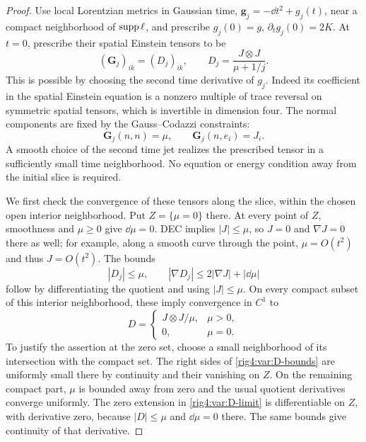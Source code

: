 \begin{proof}
Use local Lorentzian metrics in Gaussian time,
$\mathbf g_j=-\dd t^2+g_j(t)$, near a compact neighborhood of
$\operatorname{supp}\ell$, and prescribe
$g_j(0)=g$, $\partial_tg_j(0)=2K$. At $t=0$, prescribe their spatial
Einstein tensors to be
\begin{equation}
 (\mathbf G_j)_{ik}=(D_j)_{ik},\qquad
 D_j=\frac{J\otimes J}{\mu+1/j}.
\label{rig4:var:spatial-Einstein}
\end{equation}
This is possible by choosing the second time derivative of $g_j$.
Indeed its coefficient in the spatial Einstein equation is a nonzero
multiple of trace reversal on symmetric spatial tensors, which is
invertible in dimension four. The normal components are fixed by the
Gauss--Codazzi constraints:
\[
 \mathbf G_j(n,n)=\mu,\qquad \mathbf G_j(n,e_i)=J_i.
\]
A smooth choice of the second time jet realizes the prescribed tensor in
a sufficiently small time neighborhood. No equation or energy condition
away from the initial slice is required.

We first check the convergence of these tensors along the slice, within
the chosen open interior neighborhood. Put $Z=\{\mu=0\}$ there.
At every point of $Z$, smoothness and $\mu\ge0$ give
$\dd\mu=0$. DEC implies $|J|\le\mu$, so $J=0$ and $\nabla J=0$ there
as well; for example, along a smooth curve through the point,
$\mu=O(t^2)$ and thus $J=O(t^2)$. The bounds
\begin{equation}
 |D_j|\le\mu,
 \qquad |\nabla D_j|\le2|\nabla J|+|\dd\mu|
\label{rig4:var:D-bounds}
\end{equation}
follow by differentiating the quotient and using $|J|\le\mu$.
On every compact subset of this interior neighborhood, these imply
convergence in $C^1$ to
\begin{equation}
 D=\begin{cases}J\otimes J/\mu,&\mu>0,\\0,&\mu=0.\end{cases}
\label{rig4:var:D-limit}
\end{equation}
To justify the assertion at the zero set, choose a small neighborhood of
its intersection with the compact set. The right sides of
\eqref{rig4:var:D-bounds} are uniformly small there by continuity and their
vanishing on $Z$. On the remaining compact part, $\mu$ is bounded away
from zero and the usual quotient derivatives converge uniformly. The
zero extension in \eqref{rig4:var:D-limit} is differentiable on $Z$, with
derivative zero, because $|D|\le\mu$ and $\dd\mu=0$ there. The same bounds
give continuity of that derivative.


\end{proof}
